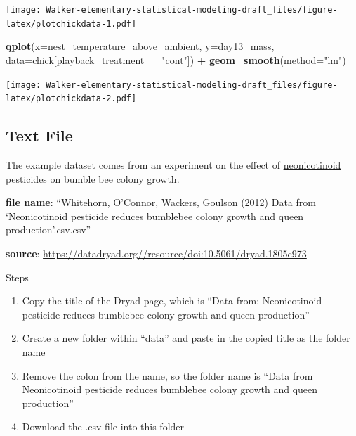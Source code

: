 \documentclass[]{book}
\newenvironment{Shaded}{\begin{snugshade}}{\end{snugshade}}
\newcommand{\KeywordTok}[1]{\textcolor[rgb]{0.13,0.29,0.53}{\textbf{#1}}}
\newcommand{\DataTypeTok}[1]{\textcolor[rgb]{0.13,0.29,0.53}{#1}}
\newcommand{\StringTok}[1]{\textcolor[rgb]{0.31,0.60,0.02}{#1}}
\newcommand{\OperatorTok}[1]{\textcolor[rgb]{0.81,0.36,0.00}{\textbf{#1}}}
\newcommand{\NormalTok}[1]{#1}
\providecommand{\tightlist}{%
  \setlength{\itemsep}{0pt}\setlength{\parskip}{0pt}}
\begin{document}
\texttt{[image: Walker-elementary-statistical-modeling-draft\_files/figure-latex/plotchickdata-1.pdf]}

\begin{Shaded}
\begin{Highlighting}[]
\KeywordTok{qplot}\NormalTok{(}\DataTypeTok{x=}\NormalTok{nest_temperature_above_ambient, }\DataTypeTok{y=}\NormalTok{day13_mass, }\DataTypeTok{data=}\NormalTok{chick[playback_treatment}\OperatorTok{==}\StringTok{"cont"}\NormalTok{]) }\OperatorTok{+}
\StringTok{  }\KeywordTok{geom_smooth}\NormalTok{(}\DataTypeTok{method=}\StringTok{"lm"}\NormalTok{)}
\end{Highlighting}
\end{Shaded}

\texttt{[image: Walker-elementary-statistical-modeling-draft\_files/figure-latex/plotchickdata-2.pdf]}

\subsection{Text File}\label{text-file}

The example dataset comes from an experiment on the effect of
\href{http://science.sciencemag.org/content/early/2012/03/28/science.1215025}{neonicotinoid
pesticides on bumble bee colony growth}.

\textbf{file name}: ``Whitehorn, O'Connor, Wackers, Goulson (2012) Data
from `Neonicotinoid pesticide reduces bumblebee colony growth and queen
production'.csv.csv''

\textbf{source}:
\url{https://datadryad.org//resource/doi:10.5061/dryad.1805c973}

Steps

\begin{enumerate}
\def\labelenumi{\arabic{enumi}.}
\tightlist
\item
  Copy the title of the Dryad page, which is ``Data from: Neonicotinoid
  pesticide reduces bumblebee colony growth and queen production''
\item
  Create a new folder within ``data'' and paste in the copied title as
  the folder name
\item
  Remove the colon from the name, so the folder name is ``Data from
  Neonicotinoid pesticide reduces bumblebee colony growth and queen
  production''
\item
  Download the .csv file into this folder
\end{enumerate}
\end{document}
